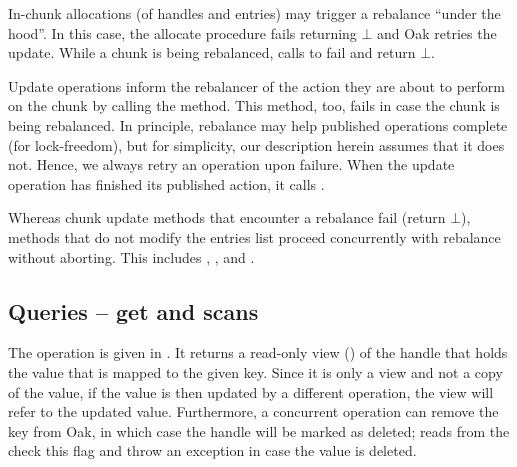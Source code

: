 In-chunk allocations (of handles and entries) may trigger a rebalance ``under the hood''. 
In this case, the allocate procedure fails returning $\bot$ and Oak retries the update. 
While a chunk is being rebalanced, calls to  fail and return $\bot$.

Update operations inform the rebalancer of the action they are about to perform on the chunk by calling the  method.
This method, too, fails in case the chunk is being rebalanced. 
In principle,  rebalance may help published operations complete (for lock-freedom), but for simplicity, our description 
herein assumes that it does not. Hence, we always retry an operation upon failure.
When the update operation has finished its published action, it calls . 

Whereas chunk update methods that encounter a rebalance fail (return $\bot$),  methods that do not modify the entries list proceed concurrently with rebalance without aborting.
This includes , , and .  

% 


\subsection{Queries -- get and scans} 
\label{ssec:queries}


The  operation is given in . 
It returns a read-only view () of the handle that holds the value that is mapped to the given key. %
Since it is only a view and not a copy of the value, if the value is then updated by a different operation, the view will refer to the updated value. 
Furthermore, a concurrent operation can remove the key from Oak, in which case the handle will be marked as deleted;  reads from the   check this  flag
and throw an exception in case the value is deleted. 



